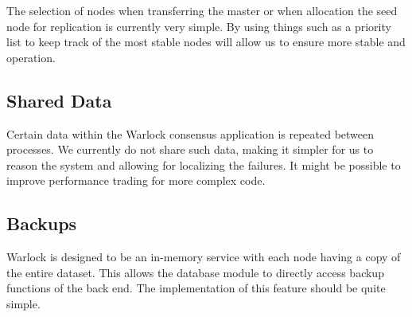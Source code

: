 The selection of nodes when transferring the master or when allocation the
seed node for replication is currently very simple. By using things such
as a priority list to keep track of the most stable nodes will allow us to
ensure more stable and operation.

\subsection{Shared Data}

Certain data within the Warlock consensus application is repeated between
processes. We currently do not share such data, making it simpler for us
to reason the system and allowing for localizing the failures. It might
be possible to improve performance trading for more complex code.

\subsection{Backups}

Warlock is designed to be an in-memory service with each node having a copy
of the entire dataset. This allows the database module to directly access
backup functions of the back end. The implementation of this feature should be
quite simple.

